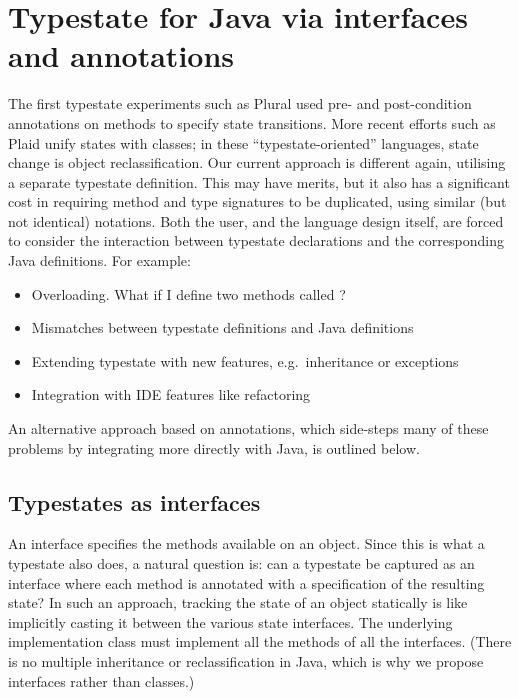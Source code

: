 \section{Typestate for Java via interfaces and annotations}

The first typestate experiments such as Plural \cite{bierhoff11} used
pre- and post-condition annotations on methods to specify state
transitions. More recent efforts such as Plaid \cite{garcia14} unify
states with classes; in these ``typestate-oriented'' languages, state
change is object reclassification. Our current approach is different
again, utilising a separate typestate definition. This may have
merits, but it also has a significant cost in requiring method and
type signatures to be duplicated, using similar (but not identical)
notations. Both the user, and the language design itself, are forced
to consider the interaction between typestate declarations and the
corresponding Java definitions. For example:

\begin{itemize}
\item Overloading. What if I define two methods called ?
\item Mismatches between typestate definitions and Java definitions
\item Extending typestate with new features, e.g.~inheritance or
  exceptions
\item Integration with IDE features like refactoring
\end{itemize}

\noindent An alternative approach based on annotations, which
side-steps many of these problems by integrating more directly with
Java, is outlined below.

\subsection{Typestates as interfaces}

An interface specifies the methods available on an object. Since this
is what a typestate also does, a natural question is: can a typestate
be captured as an interface where each method is annotated with a
specification of the resulting state? In such an approach, tracking
the state of an object statically is like implicitly casting it
between the various state interfaces. The underlying implementation
class must implement all the methods of all the interfaces. (There is
no multiple inheritance or reclassification in Java, which is why we
propose interfaces rather than classes.)

